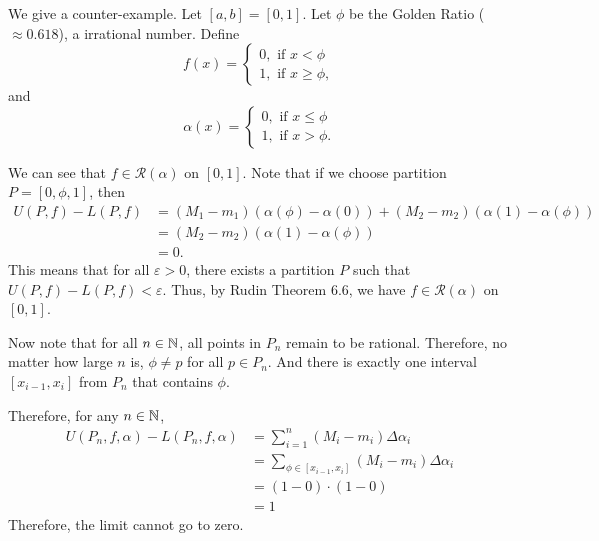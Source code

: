 \documentclass[12pt]{article}
\begin{document}
\begin{fproof}[4(b)]
    We give a counter-example.
    Let \([a,b] = [0,1]\). Let \(\phi\) be the Golden Ratio (\(\approx 0.618\)), a irrational number.
    Define
    \[
    f(x) = \begin{cases}
      0, \text{ if } x < \phi\\
      1, \text{ if } x \geq \phi,
    \end{cases}
    \]
    and 
    \[
    \alpha(x) = \begin{cases}
      0, \text{ if } x \leq \phi\\
      1, \text{ if } x > \phi.
    \end{cases}
    \]
  
    We can see that \(f \in \mathcal{R}(\alpha)\) on \([0,1]\).
    Note that if we choose partition \(P = [0, \phi, 1]\), then 
    \begin{align*}
      U(P,f) - L(P,f) &= (M_1 - m_1)(\alpha(\phi) - \alpha(0)) + (M_2 - m_2)(\alpha(1) - \alpha(\phi)) \\
      & = (M_2 - m_2)(\alpha(1) - \alpha(\phi)) \tag{as \(\alpha(1) = \alpha(\phi)\)}\\
      & = 0 \tag{as \(M_2 = m_2\)}.
    \end{align*}
    This means that for all \(\varepsilon > 0\), there exists a partition \(P\) such that \(U(P,f) - L(P,f) < \varepsilon\). Thus, by Rudin Theorem 6.6, we have \(f \in \mathcal{R}(\alpha)\) on \([0,1]\).
  
    Now note that for all \(n \in \mathbb {N}\), all points in \(P_n\) remain to be rational.
    Therefore, no matter how large \(n\) is, \(\phi \neq p\) for all \(p \in P_n\).
    And there is exactly one interval \([x_{i-1}, x_i]\) from \(P_n\) that contains \(\phi\).
  
    Therefore, for any \(n \in \mathbb {N}\),
    \begin{align*}
      U(P_n, f, \alpha) - L(P_n, f, \alpha) &= \sum_{i=1}^{n} (M_i - m_i) \Delta \alpha_i\\
      &= \sum_{\phi \in [x_{i-1}, x_i]} (M_i - m_i)\Delta \alpha_i\\
      &= (1 - 0) \cdot (1-0)\\
      & = 1
    \end{align*}
    Therefore, the limit cannot go to zero.
\end{fproof}
\end{document}
